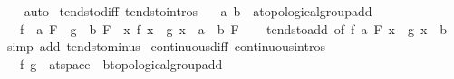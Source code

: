 \begin{isabellebody}
\ \ \isamarkupfalse%
\ auto%
\endisatagproof
{\isafoldproof}%
%
\isadelimproof
\isanewline
%
\endisadelimproof
\isanewline
{}\isamarkupfalse%
\ tendsto{\isacharunderscore}{\kern0pt}diff\ {\isacharbrackleft}{\kern0pt}tendsto{\isacharunderscore}{\kern0pt}intros{\isacharbrackright}{\kern0pt}{\isacharcolon}{\kern0pt}\isanewline
\ \ \ a\ b\ {\isacharcolon}{\kern0pt}{\isacharcolon}{\kern0pt}\ {\isachardoublequoteopen}{\isacharprime}{\kern0pt}a{\isacharcolon}{\kern0pt}{\isacharcolon}{\kern0pt}topological{\isacharunderscore}{\kern0pt}group{\isacharunderscore}{\kern0pt}add{\isachardoublequoteclose}\isanewline
\ \ \ {\isachardoublequoteopen}{\isacharparenleft}{\kern0pt}f\ {\isasymlonglongrightarrow}\ a{\isacharparenright}{\kern0pt}\ F\ {\isasymLongrightarrow}\ {\isacharparenleft}{\kern0pt}g\ {\isasymlonglongrightarrow}\ b{\isacharparenright}{\kern0pt}\ F\ {\isasymLongrightarrow}\ {\isacharparenleft}{\kern0pt}{\isacharparenleft}{\kern0pt}{\isasymlambda}x{\isachardot}{\kern0pt}\ f\ x\ {\isacharminus}{\kern0pt}\ g\ x{\isacharparenright}{\kern0pt}\ {\isasymlonglongrightarrow}\ a\ {\isacharminus}{\kern0pt}\ b{\isacharparenright}{\kern0pt}\ F{\isachardoublequoteclose}\isanewline
%
\isadelimproof
\ \ %
\endisadelimproof
%
\isatagproof
{}\isamarkupfalse%
\ tendsto{\isacharunderscore}{\kern0pt}add\ {\isacharbrackleft}{\kern0pt}of\ f\ a\ F\ {\isachardoublequoteopen}{\isasymlambda}x{\isachardot}{\kern0pt}\ {\isacharminus}{\kern0pt}\ g\ x{\isachardoublequoteclose}\ {\isachardoublequoteopen}{\isacharminus}{\kern0pt}\ b{\isachardoublequoteclose}{\isacharbrackright}{\kern0pt}\ \isamarkupfalse%
\ {\isacharparenleft}{\kern0pt}simp\ add{\isacharcolon}{\kern0pt}\ tendsto{\isacharunderscore}{\kern0pt}minus{\isacharparenright}{\kern0pt}%
\endisatagproof
{\isafoldproof}%
%
\isadelimproof
\isanewline
%
\endisadelimproof
\isanewline
{}\isamarkupfalse%
\ continuous{\isacharunderscore}{\kern0pt}diff\ {\isacharbrackleft}{\kern0pt}continuous{\isacharunderscore}{\kern0pt}intros{\isacharbrackright}{\kern0pt}{\isacharcolon}{\kern0pt}\isanewline
\ \ \ f\ g\ {\isacharcolon}{\kern0pt}{\isacharcolon}{\kern0pt}\ {\isachardoublequoteopen}{\isacharprime}{\kern0pt}a{\isacharcolon}{\kern0pt}{\isacharcolon}{\kern0pt}t{}{\isacharunderscore}{\kern0pt}space\ {\isasymRightarrow}\ {\isacharprime}{\kern0pt}b{\isacharcolon}{\kern0pt}{\isacharcolon}{\kern0pt}topological{\isacharunderscore}{\kern0pt}group{\isacharunderscore}{\kern0pt}add{\isachardoublequoteclose}\isanewline

\end{isabellebody}
